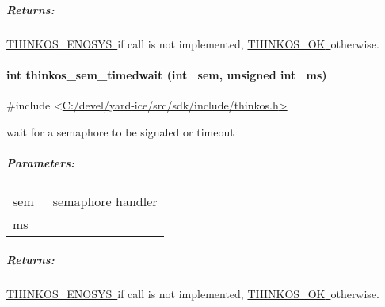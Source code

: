 {\subparagraph{\texorpdfstring{{Returns:}}{Returns:}}\label{returns-26}

{\protect\hyperlink{h.3s49zyc}{THINKOS\_ENOSYS}}{\protect\hyperlink{h.3s49zyc}{~}}{if
call is not implemented,
}{\protect\hyperlink{h.2fk6b3p}{THINKOS\_OK}}{\protect\hyperlink{h.2fk6b3p}{~}}{otherwise.
}

\paragraph{\texorpdfstring{{int thinkos\_sem\_timedwait (int ~sem,
unsigned int
~ms)}}{int thinkos\_sem\_timedwait (int ~sem, unsigned int ~ms)}}\label{int-thinkos_sem_timedwait-int-sem-unsigned-int-ms}

{}

{\#include
\textless{}}{\protect\hyperlink{h.pkwqa1}{C:/devel/yard-ice/src/sdk/include/thinkos.h}}{\protect\hyperlink{h.pkwqa1}{\textgreater{}}}

{wait for a semaphore to be signaled or timeout }

{}

\subparagraph{\texorpdfstring{{Parameters:}}{Parameters:}}\label{parameters-23}

\protect\hypertarget{t.33a353b3a299d454126b7888c7a887c8e8d7a8ee}{}{}\protect\hypertarget{t.23}{}{}

\begin{longtable}[]{@{}ll@{}}
\toprule
\begin{minipage}[t]{0.47\columnwidth}\raggedright\strut
{sem}{~}\strut
\end{minipage} & \begin{minipage}[t]{0.47\columnwidth}\raggedright\strut
{semaphore handler }\strut
\end{minipage}\tabularnewline
\begin{minipage}[t]{0.47\columnwidth}\raggedright\strut
{ms}{~}\strut
\end{minipage} & \begin{minipage}[t]{0.47\columnwidth}\raggedright\strut
{}\strut
\end{minipage}\tabularnewline
\bottomrule
\end{longtable}

\subparagraph{\texorpdfstring{{Returns:}}{Returns:}}\label{returns-27}

{\protect\hyperlink{h.3s49zyc}{THINKOS\_ENOSYS}}{\protect\hyperlink{h.3s49zyc}{~}}{if
call is not implemented,
}{\protect\hyperlink{h.2fk6b3p}{THINKOS\_OK}}{\protect\hyperlink{h.2fk6b3p}{~}}{otherwise.
}

}
